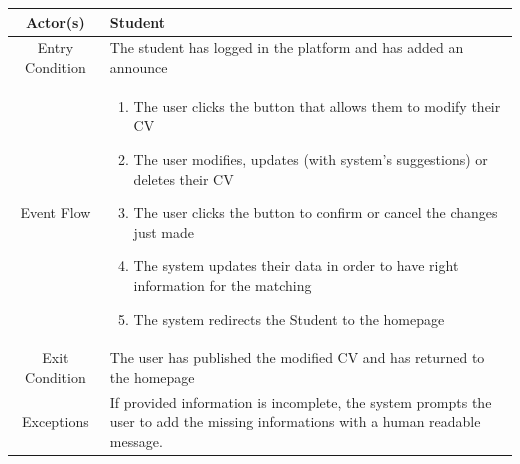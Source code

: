 \documentclass{article}
\begin{document}
\begin{table}[H]
    \centering
    \begin{tabular}{|c|p{10cm}|}
    \hline
        Actor(s)  & Student\\ 
    \hline 
        Entry Condition &          
        The student has logged in the platform and has added an announce \\
    \hline
        Event Flow &
        \begin{enumerate}
            \item The user clicks the button that allows them to modify their CV
            \item The user modifies, updates (with system's suggestions) or deletes their CV
            \item The user clicks the button to confirm or cancel the changes just made
            \item The system updates their data in order to have right information for the matching 
            \item The system redirects the Student to the homepage
        \end{enumerate}
         \\
    \hline
        Exit Condition & The user has published the modified CV and has returned to the homepage \\
    \hline
        Exceptions &  If provided information is incomplete, the system prompts the user to add the missing informations with a human readable message.\\
    \hline
    \end{tabular}
    \label{tab:my_label}
\end{table}
\end{document}
